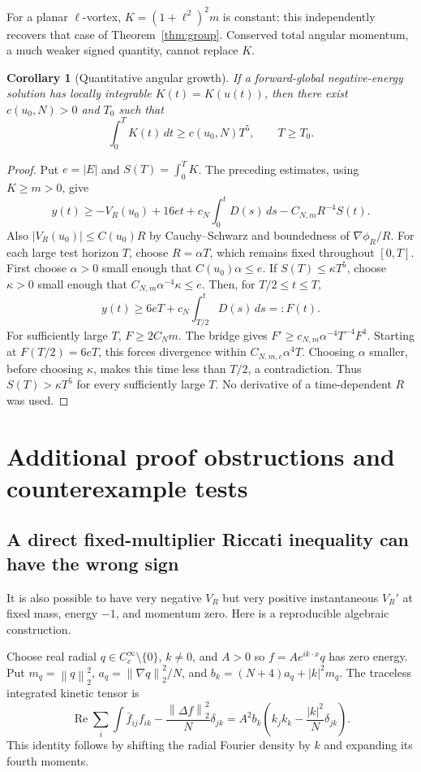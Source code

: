 \documentclass[11pt,a4paper]{article}
\newtheorem{corollary}[theorem]{Corollary}
\theoremstyle{remark}\newtheorem{remark}[theorem]{Remark}
\newcommand{\norm}[1]{\left\|#1\right\|}
\DeclareMathOperator{\Rea}{Re}
\begin{document}
For a planar $\ell$-vortex, $K=(1+\ell^2)^2m$ is constant; this independently recovers that case of Theorem~\ref{thm:group}. Conserved total angular momentum, a much weaker signed quantity, cannot replace $K$.

\begin{corollary}[Quantitative angular growth]
If a forward-global negative-energy solution has locally integrable $K(t)=K(u(t))$, then there exist $c(u_0,N)>0$ and $T_0$ such that
\[
 \int_0^T K(t)\,dt\ge c(u_0,N)T^5,\qquad T\ge T_0.
\]
\end{corollary}
\begin{proof}
Put $e=|E|$ and $S(T)=\int_0^T K$. The preceding estimates, using $K\ge m>0$, give
\[
 y(t)\ge -V_R(u_0)+16et+c_N\int_0^tD(s)\,ds-C_{N,m}R^{-4}S(t).
\]
Also $|V_R(u_0)|\le C(u_0)R$ by Cauchy--Schwarz and boundedness of $\nabla\phi_R/R$. For each large test horizon $T$, choose $R=\alpha T$, which remains fixed throughout $[0,T]$. First choose $\alpha>0$ small enough that $C(u_0)\alpha\le e$. If $S(T)\le\kappa T^5$, choose $\kappa>0$ small enough that $C_{N,m}\alpha^{-4}\kappa\le e$. Then, for $T/2\le t\le T$,
\[
 y(t)\ge6eT+c_N\int_{T/2}^tD(s)\,ds=:F(t).
\]
For sufficiently large $T$, $F\ge2C_Nm$. The bridge gives
$F'\ge c_{N,m}\alpha^{-4}T^{-4}F^4$. Starting at $F(T/2)=6eT$, this forces divergence within $C_{N,m,e}\alpha^4T$. Choosing $\alpha$ smaller, before choosing $\kappa$, makes this time less than $T/2$, a contradiction. Thus $S(T)>\kappa T^5$ for every sufficiently large $T$. No derivative of a time-dependent $R$ was used.
\end{proof}

\section{Additional proof obstructions and counterexample tests}
\subsection{A direct fixed-multiplier Riccati inequality can have the wrong sign}
It is also possible to have very negative $V_R$ but very positive instantaneous $V_R'$ at fixed mass, energy $-1$, and momentum zero. Here is a reproducible algebraic construction.

Choose real radial $q\in C_c^\infty\setminus\{0\}$, $k\ne0$, and $A>0$ so
$f=Ae^{ik\cdot x}q$ has zero energy. Put
$m_q=\norm q_2^2$, $a_q=\norm{\nabla q}_2^2/N$, and
$b_k=(N+4)a_q+|k|^2m_q$. The traceless integrated kinetic tensor is
\[
 \Rea\sum_i\int\bar f_{ij}f_{ik}
 -\frac{\norm{\Delta f}_2^2}{N}\delta_{jk}
 =A^2b_k\left(k_jk_k-\frac{|k|^2}{N}\delta_{jk}\right).
\]
This identity follows by shifting the radial Fourier density by $k$ and expanding its fourth moments.
\end{document}
